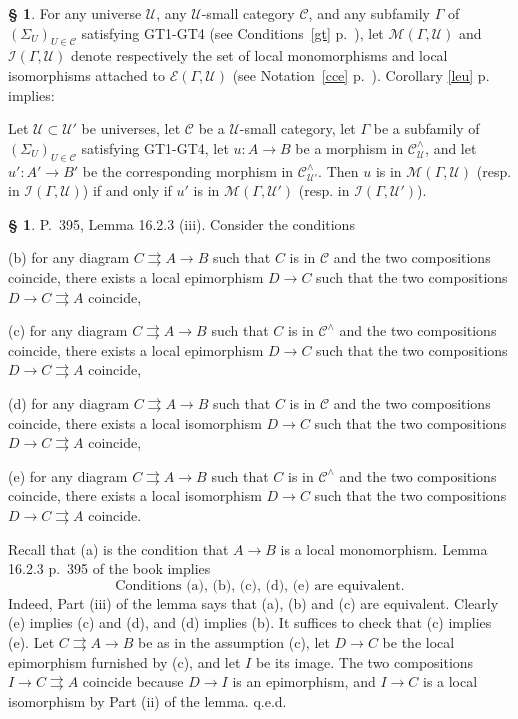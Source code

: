 \documentclass[12pt]{article}%
\theoremstyle{remark}
\theoremstyle{definition}
\newtheorem{s}[thm]{\S}%
\newcommand{\nn}{\noindent}
\newcommand{\cc}{\mathcal}
\newcommand{\C}{\mathcal C}
\newcommand{\U}{\mathcal U}
\newcommand{\parar}{\rightrightarrows}
\begin{document}
%

\begin{s}
For any universe $\U$, any $\U$-small category $\C$, and any subfamily $\Gamma$ of $(\Sigma_U)_{U\in\C}$ satisfying GT1-GT4 (see Conditions~\ref{gt} p.~\pageref{gt}), let $\cc M(\Gamma,\U)$ and $\cc I(\Gamma,\U)$ denote respectively the set of local monomorphisms and local isomorphisms attached to $\cc E(\Gamma,\U)$ (see Notation~\ref{cce} p.~\pageref{cce}). Corollary \ref{leu} p. \pageref{leu} implies:

Let $\U\subset\U'$ be universes, let $\C$ be a $\U$-small category, let $\Gamma$ be a subfamily of $(\Sigma_U)_{U\in\C}$ satisfying GT1-GT4, let $u:A\to B$ be a morphism in $\C^\wedge_\U$, and let $u':A'\to B'$ be the corresponding morphism in $\C^\wedge_{\U'}$. Then $u$ is in $\cc M(\Gamma,\U)$ (resp. in $\cc I(\Gamma,\U)$) if and only if $u'$ is in $\cc M(\Gamma,\U')$ (resp. in $\cc I(\Gamma,\U')$).
\end{s}

%

\begin{s}\label{s1623}
P.~395, Lemma 16.2.3 (iii). Consider the conditions

\nn(b) for any diagram $C\parar A\to B$ such that $C$ is in $\C$ and the two compositions coincide, there exists a local epimorphism $D\to C$ such that the two compositions $D\to C\parar A$ coincide,

\nn(c) for any diagram $C\parar A\to B$ such that $C$ is in $\C^\wedge$ and the two compositions coincide, there exists a local epimorphism $D\to C$ such that the two compositions $D\to C\parar A$ coincide,

\nn(d) for any diagram $C\parar A\to B$ such that $C$ is in $\C$ and the two compositions coincide, there exists a local isomorphism $D\to C$ such that the two compositions $D\to C\parar A$ coincide,

\nn(e) for any diagram $C\parar A\to B$ such that $C$ is in $\C^\wedge$ and the two compositions coincide, there exists a local isomorphism $D\to C$ such that the two compositions $D\to C\parar A$ coincide.

Recall that (a) is the condition that $A\to B$ is a local monomorphism. Lemma 16.2.3 p.~395 of the book implies 
%
\begin{equation}\label{e1623}
\text{Conditions (a), (b), (c), (d), (e) are equivalent.}
\end{equation}
%
Indeed, Part (iii) of the lemma says that (a), (b) and (c) are equivalent. Clearly (e) implies (c) and (d), and (d) implies (b). It suffices to check that (c) implies (e). Let $C\parar A\to B$ be as in the assumption (c), let $D\to C$ be the local epimorphism furnished by (c), and let $I$ be its image. The two compositions $I\to C\parar A$ coincide because $D\to I$ is an epimorphism, and $I\to C$ is a local isomorphism by Part (ii) of the lemma. q.e.d.
\end{s}
\end{document}
